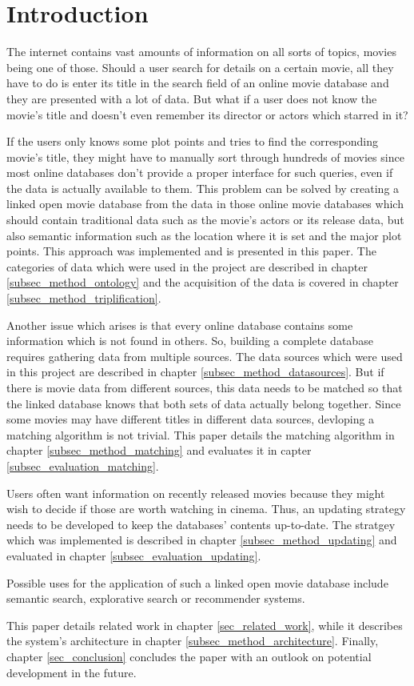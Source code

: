 \section{Introduction}
\label{sec_introduction}

The internet contains vast amounts of information on all sorts of topics, movies being one of those.
Should a user search for details on a certain movie, all they have to do is enter its title in the search field of an online movie database and they are presented with a lot of data.
But what if a user does not know the movie's title and doesn't even remember its director or actors which starred in it?

If the users only knows some plot points and tries to find the corresponding movie's title, they might have to manually sort through hundreds of movies since most online databases don't provide a proper interface for such queries, even if the data is actually available to them.
This problem can be solved by creating a linked open movie database from the data in those online movie databases which should contain traditional data such as the movie's actors or its release data, but also semantic information such as the location where it is set and the major plot points.
This approach was implemented and is presented in this paper.
The categories of data which were used in the project are described in chapter \ref{subsec_method_ontology} and the acquisition of the data is covered in chapter \ref{subsec_method_triplification}.

Another issue which arises is that every online database contains some information which is not found in others.
So, building a complete database requires gathering data from multiple sources.
The data sources which were used in this project are described in chapter \ref{subsec_method_datasources}.
But if there is movie data from different sources, this data needs to be matched so that the linked database knows that both sets of data actually belong together.
Since some movies may have different titles in different data sources, devloping a matching algorithm is not trivial.
This paper details the matching algorithm in chapter \ref{subsec_method_matching} and evaluates it in capter \ref{subsec_evaluation_matching}.

Users often want information on recently released movies because they might wish to decide if those are worth watching in cinema.
Thus, an updating strategy needs to be developed to keep the databases' contents up-to-date.
The stratgey which was implemented is described in chapter \ref{subsec_method_updating} and evaluated in chapter \ref{subsec_evaluation_updating}.

Possible uses for the application of such a linked open movie database include semantic search, explorative search or recommender systems.

This paper details related work in chapter \ref{sec_related_work}, while it describes the system's architecture in chapter \ref{subsec_method_architecture}. Finally, chapter \ref{sec_conclusion} concludes the paper with an outlook on potential development in the future.